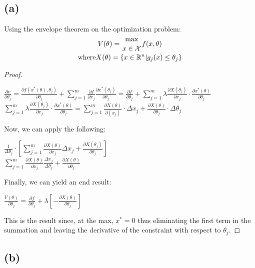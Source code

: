 \documentclass[10pt, a4paper]{article}
\begin{document}
  \subsection*{(a)}
    Using the envelope theorem on the optimization problem:
    \begin{gather*}
      V(\theta) = {\max\atop{x\in\mathcal{X}}}f(x,\theta) \\
      \text{where} X(\theta) = \{x\in\mathbb{R}^n|g_j(x)\leq\theta_j\} \\
    \end{gather*}
    \begin{proof}
      \begin{center}
        $\frac{\partial v}{\partial\theta_j} = \frac{\partial f(x^*(\theta),\theta_j)}{\partial\theta_j}
        +\sum\limits_{j=1}^m\frac{\partial f}{\partial x_j}\frac{\partial x^*(\theta_j)}{\partial\theta_j}
        = \frac{\partial f}{\partial\theta_j} + \sum\limits_{j=1}^m\lambda\frac{\partial X(\theta_j)}{\partial x_j}
        \cdot\frac{\partial x^*(\theta)}{\partial\theta_j}$ \\
        $\sum\limits_{j=1}^m\lambda\frac{\partial X(\theta_j)}{\partial x_j}\cdot\frac{\partial x^*(\theta)}{\partial\theta_j}
        = \sum\limits_{j=1}^m\frac{\partial X(\theta)}{\partial(x_j)}\cdot\Delta x_j + \frac{\partial X(\theta)}
        {\partial\theta_j}\cdot\Delta\theta_j$ \\
      \end{center}
      Now, we can apply the following:
      \begin{center}
        $\frac{1}{\Delta\theta_j}\cdot[\sum\limits_{j=1}^m\frac{\partial X(\theta)}{\partial x_j}\Delta x_j +
        \frac{\partial X(\theta_j)}{\partial\theta_j}]$ \\
        $\sum\limits_{j=1}^m\frac{\partial X(\theta)}{\partial x_j}\frac{\Delta x_j}{\Delta\theta_j} +
        \frac{\partial X(\theta)}{\partial\theta_j}$ \\
      \end{center}
      Finally, we can yield an end result:
      \begin{center}
        $\frac{V(\theta)}{\partial\theta_j} = \frac{\partial f}{\partial \theta_j} + \lambda[-\frac{\partial X(\theta)}
        {\partial\theta_j}]$
      \end{center}
      This is the result since, at the max, $x^*=0$ thus eliminating the first term in the summation and leaving the derivative of the
      constraint with respect to $\theta_j$.
    \end{proof}
  \subsection*{(b)}
     
\end{document}
